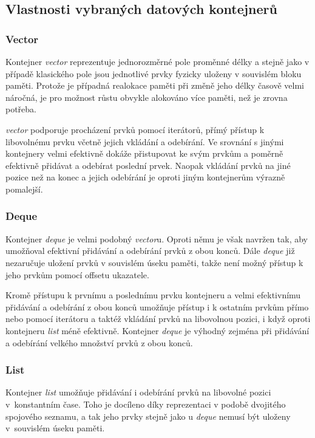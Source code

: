 \documentclass[thesis=M,czech]{FITthesis}[2012/06/26]
\begin{document}
\subsection{Vlastnosti vybraných datových kontejnerů}

\subsubsection{Vector}

Kontejner \textit{vector} reprezentuje jednorozměrné pole proměnné délky a stejně jako v případě klasického pole jsou
jednotlivé prvky fyzicky uloženy v souvislém bloku paměti. Protože je případná realokace paměti při změně jeho délky 
časově velmi náročná, je pro možnost růstu obvykle alokováno více paměti, než je zrovna potřeba. 

\textit{vector} podporuje procházení prvků pomocí iterátorů, přímý přístup k libovolnému prvku včetně jejich vkládání a 
odebírání. Ve srovnání s jinými kontejnery velmi efektivně dokáže přistupovat ke svým prvkům a poměrně efektivně přidávat 
a odebírat poslední prvek. Naopak vkládání prvků na jiné pozice než na konec a jejich odebírání je oproti jiným kontejnerům 
výrazně pomalejší. \cite{cppvector}

\subsubsection{Deque}

Kontejner \textit{deque} je velmi podobný \textit{vector}u. Oproti němu je však navržen tak, aby umožňoval efektivní přidávání 
a odebírání prvků z obou konců. Dále \textit{deque} již nezaručuje uložení prvků v souvislém úseku paměti, takže není možný 
přístup k jeho prvkům pomocí offsetu ukazatele. 

Kromě přístupu k prvnímu a poslednímu prvku kontejneru a velmi efektivnímu přidávání a odebírání z obou konců umožňuje přístup i 
k ostatním prvkům přímo nebo pomocí iterátoru a taktéž vkládání prvků na libovolnou pozici, i když oproti kontejneru \textit{list} 
méně efektivně. Kontejner \textit{deque} je výhodný zejména při přidávání a odebírání velkého množství prvků z obou 
konců. \cite{cppdeque}

\subsubsection{List}

Kontejner \textit{list} umožňuje přidávání i odebírání prvků na libovolné pozici v~konstantním čase. Toho je docíleno díky 
reprezentaci v podobě dvojitého spojového seznamu, a tak jeho prvky stejně jako u \textit{deque} nemusí být uloženy 
v~souvislém úseku paměti. 
\end{document}
